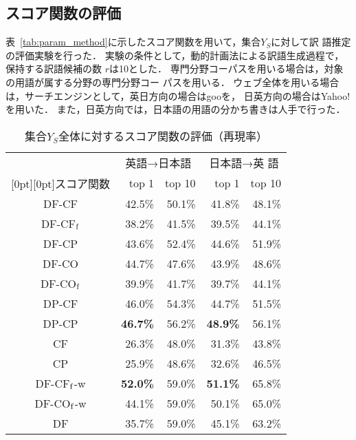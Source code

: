 \documentclass[japanese]{jnlp_1.3a}
\begin{document}
\subsection{スコア関数の評価}
\label{sec:evaluation}



表~\ref{tab:param_method}に示したスコア関数を用いて，集合$Y_S$に対して訳
語推定の評価実験を行った．
実験の条件として，動的計画法による訳語生成過程で，保持する訳語候補の数
$r$は10とした．
専門分野コーパスを用いる場合は，対象の用語が属する分野の専門分野コー
パスを用いる．
ウェブ全体を用いる場合は，サーチエンジンとして，英日方向の場合はgooを，
日英方向の場合はYahoo!を用いた．
また，日英方向では，日本語の用語の分かち書きは人手で行った．


\begin{table}[b]
 \small
 \centering
 \caption{集合$Y_S$全体に対するスコア関数の評価（再現率）}
 \label{tab:evaluation}
 \begin{tabular}{|c|r|r|r|r|}
  \hline
  & \multicolumn{2}{|c|}{英語→日本語} & \multicolumn{2}{|c|}{日本語→英
  語} \\
      \cline{2-5}
      \raisebox{0.5\normalbaselineskip}[0pt][0pt]{スコア関数} 
	& top 1 & top 10 & top 1 & top 10 \\
  \hline \hline
  DF-CF     & 42.5\% & 50.1\% & 41.8\% & 48.1\% \\
  DF-CF${\rm _f}$    & 38.2\% & 41.5\% & 39.5\% & 44.1\% \\
  DF-CP     & 43.6\% & 52.4\% & 44.6\% & 51.9\% \\
  DF-CO     & 44.7\% & 47.6\% & 43.9\% & 48.6\% \\
  DF-CO${\rm _f}$ & 39.9\% & 41.7\% & 39.7\% & 44.1\%\\
  DP-CF     & 46.0\% & 54.3\% & 44.7\% & 51.5\% \\
  DP-CP     & {\bf 46.7\%} & 56.2\% & {\bf 48.9\%} & 56.1\% \\
  CF        & 26.3\% & 48.0\% & 31.3\% & 43.8\% \\
  CP        & 25.9\% & 48.6\% & 32.6\% & 46.5\% \\
  \hline
  DF-CF${\rm _f}$-w  & {\bf 52.0\%} & 59.0\% & {\bf 51.1\%} & 65.8\% \\
  DF-CO${\rm _f}$-w  & 44.1\% & 59.0\% & 50.1\% & 65.0\% \\
  \hline
  DF        & 35.7\% & 59.0\% & 45.1\% & 63.2\% \\
  \hline
 \end{tabular}
\end{table}
\end{document}
